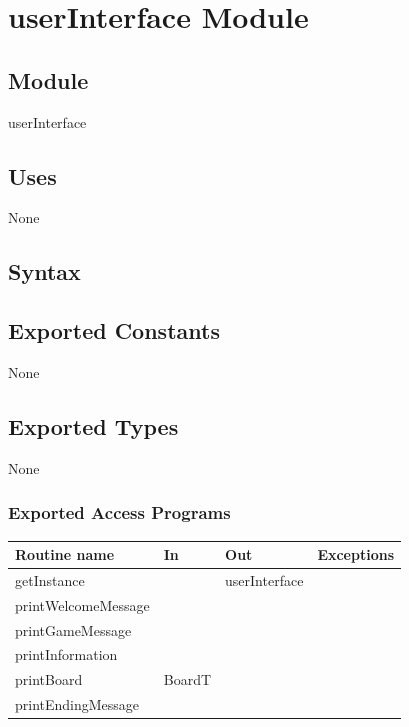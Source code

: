 \documentclass[12pt]{article}
\begin{document}
\newpage

\section* {userInterface Module}

\subsection* {Module}

userInterface

\subsection*{Uses}

None

\subsection* {Syntax}

\subsection*{Exported Constants}

None

\subsection*{Exported Types}

None

\subsubsection* {Exported Access Programs}

\begin{tabular}{| l | l | l | p{6cm} |}
\hline
\textbf{Routine name} & \textbf{In} & \textbf{Out} & \textbf{Exceptions}\\
\hline
getInstance &  & userInterface & \\
\hline
printWelcomeMessage &  &  & \\
\hline
printGameMessage &  &  & \\
\hline
printInformation &  &  & \\
\hline
printBoard & BoardT &  & \\
\hline
printEndingMessage &  &  & \\
\hline
\end{tabular}
\end{document}
